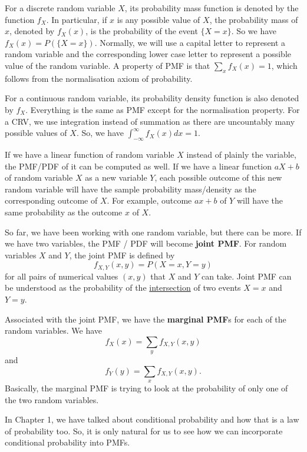 \documentclass[11pt, a4paper, oneside]{book}
\theoremstyle{definition}
\begin{document}
\noindent For a discrete random variable $X$, its probability mass function is denoted by the function $f_X$. In particular, if $x$ is any possible value of $X$, the probability mass of $x$, denoted by $f_X(x)$, is the probability of the event $\{X = x\}$. So we have $f_X(x) = P(\{ X = x\})$. Normally, we will use a capital letter to represent a random variable and the corresponding lower case letter to represent a possible value of the random variable. A property of PMF is that $\sum_x f_X(x) = 1$, which follows from the normalisation axiom of probability. 

\noindent For a continuous random variable, its probability density function is also denoted by $f_X$. Everything is the same as PMF except for the normalisation property. For a CRV, we use integration instead of summation as there are uncountably many possible values of $X$. So, we have $\int_{-\infty}^{\infty} f_X(x) dx = 1$.

\noindent If we have a linear function of random variable $X$ instead of plainly the variable, the PMF/PDF of it can be computed as well. If we have a linear function $aX + b$ of random variable $X$ as a new variable $Y$, each possible outcome of this new random variable will have the sample probability mass/density as the corresponding outcome of $X$. For example, outcome $ax+b$ of $Y$ will have the same probability as the outcome $x$ of $X$.

\noindent So far, we have been working with one random variable, but there can be more. If we have two variables, the PMF / PDF will become \textbf{joint PMF}. For random variables $X$ and $Y$, the joint PMF is defined by \[
f_{X,Y}(x,y) = P(X = x, Y = y)
\]
for all pairs of numerical values $(x,y)$ that $X$ and $Y$ can take. Joint PMF can be understood as the probability of the \underline{intersection} of two events $X=x$ and $Y=y$. 

\noindent Associated with the joint PMF, we have the \textbf{marginal PMF}s for each of the random variables. We have\[
f_X(x) = \sum_y f_{X,Y}(x,y)
\]
and \[
f_Y(y) = \sum_x f_{X,Y}(x,y).
\]
Basically, the marginal PMF is trying to look at the probability of only one of the two random variables.


\noindent In Chapter 1, we have talked about conditional probability and how that is a law of probability too. So, it is only natural for us to see how we can incorporate conditional probability into PMFs. 
\end{document}
